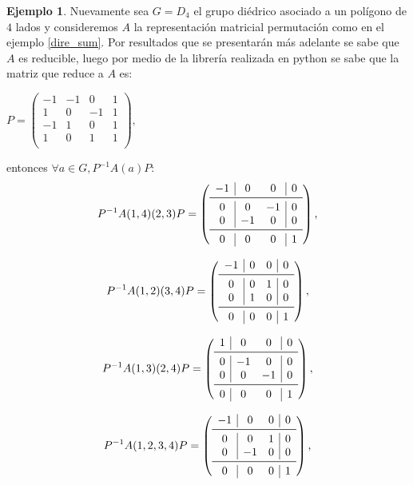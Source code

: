 \documentclass[12pt]{book}
\theoremstyle{definition}
\newtheorem{example}[theorem]{Ejemplo}
\newcounter{in}
\begin{document}
\begin{example}
Nuevamente sea $G = D_{4}$ el grupo diédrico asociado a un polígono de $4$ lados y consideremos $A$ la representación matricial permutación como en el ejemplo \ref{dire_sum}. Por resultados que se presentarán más adelante se sabe que $A$ es reducible, luego por medio de la librería realizada en python se sabe que la matriz que reduce a $A$ es:
\begin{center} 
$P = \begin{pmatrix}
-1 &  -1 &  0 &  1 \\ 
1 &  0 &  -1 &  1 \\  
-1 &  1 &  0 &  1 \\ 
1 &  0 &  1 &  1 \\
\end{pmatrix},$
\end{center}
entonces $\forall a \in G, P^{-1}A(a)P:$
\[
P^{-1}A(1, 4)(2, 3)P =
\left( \begin{array}{c|cc|c}
-1 &  0 &  0 & 0 \\
\midrule
 0 &  0 & -1 & 0 \\
 0 & -1 &  0 & 0 \\
\midrule
 0 &  0 &  0 & 1 \\
\end{array}\right), 
\]

\[
P^{-1}A(1, 2)(3, 4)P =
\left( \begin{array}{c|cc|c}
-1 & 0 & 0 & 0 \\
\midrule
 0 & 0 & 1 & 0 \\
 0 & 1 & 0 & 0 \\ 
\midrule
 0 & 0 & 0 & 1 \\ 
\end{array}\right),
\]

\[
P^{-1}A(1, 3)(2, 4)P =
\left( \begin{array}{c|cc|c}
1 &  0 &  0 & 0 \\
\midrule
0 & -1 &  0 & 0 \\
0 &  0 & -1 & 0 \\
\midrule
0 &  0 &  0 & 1 \\
\end{array}\right),
\]

\[
P^{-1}A(1, 2, 3, 4)P =
\left( \begin{array}{c|cc|c}
-1 &  0 & 0 & 0 \\
\midrule
 0 &  0 & 1 & 0 \\
 0 & -1 & 0 & 0 \\
\midrule
 0 &  0 & 0 & 1 \\
\end{array}\right),
\]


\end{example}
\end{document}
